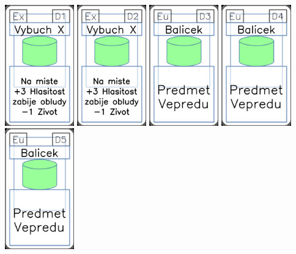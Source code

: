 \documentclass[a4paper]{article}
\begin{document}
	\includegraphics[width=3.0cm]{img-4_15}
	\includegraphics[width=3.0cm]{img-4_16}
	\includegraphics[width=3.0cm]{img-4_17}
	\includegraphics[width=3.0cm]{img-4_18}
	\includegraphics[width=3.0cm]{img-4_19}
\end{document}
